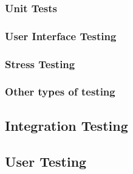 \subsubsection{Unit Tests}

\subsubsection{User Interface Testing}

\subsubsection{Stress Testing}

\subsubsection{Other types of testing}

\subsection{Integration Testing}

\subsection{User Testing}
